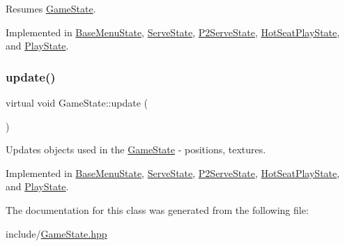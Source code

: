 Resumes \mbox{\hyperlink{class_game_state}{Game\+State}}. 



Implemented in \mbox{\hyperlink{class_base_menu_state_a8b0bba27d448b83a1f8f4ceca8dde07e}{Base\+Menu\+State}}, \mbox{\hyperlink{class_serve_state_ae9a501a1f103b02685fdd4caac5685e5}{Serve\+State}}, \mbox{\hyperlink{class_p2_serve_state_a46b9a456d44c6f22bf5bbdb62e71e490}{P2\+Serve\+State}}, \mbox{\hyperlink{class_hot_seat_play_state_a7acf9709fdb1527a321730c49783cb50}{Hot\+Seat\+Play\+State}}, and \mbox{\hyperlink{class_play_state_ad4dda6c0b72ce34bd9caaade8a5562b9}{Play\+State}}.

\mbox{\label{class_game_state_a66b11afe355a9479f94aaf76576980bd}} 
\subsubsection{\texorpdfstring{update()}{update()}}
{\footnotesize\ttfamily virtual void Game\+State\+::update (\begin{DoxyParamCaption}\item[{\mbox{\hyperlink{class_game_engine}{Game\+Engine}} $\ast$}]{ }\end{DoxyParamCaption})\hspace{0.3cm}{\ttfamily [pure virtual]}}



Updates objects used in the \mbox{\hyperlink{class_game_state}{Game\+State}} -\/ positions, textures. 



Implemented in \mbox{\hyperlink{class_base_menu_state_abfc8c5d2c7c3811443fc79a107a5936e}{Base\+Menu\+State}}, \mbox{\hyperlink{class_serve_state_ac227c95e6d1ed3f3d1fc01c4035db847}{Serve\+State}}, \mbox{\hyperlink{class_p2_serve_state_a1f0ddd25c72c4e9033418a32f5389e22}{P2\+Serve\+State}}, \mbox{\hyperlink{class_hot_seat_play_state_a63baf261e84e10203286fc82082cccdd}{Hot\+Seat\+Play\+State}}, and \mbox{\hyperlink{class_play_state_ad784c6b3e75c68505df30d51ebce4523}{Play\+State}}.



The documentation for this class was generated from the following file\+:\begin{DoxyCompactItemize}
\item 
include/\mbox{\hyperlink{_game_state_8hpp}{Game\+State.\+hpp}}\end{DoxyCompactItemize}

